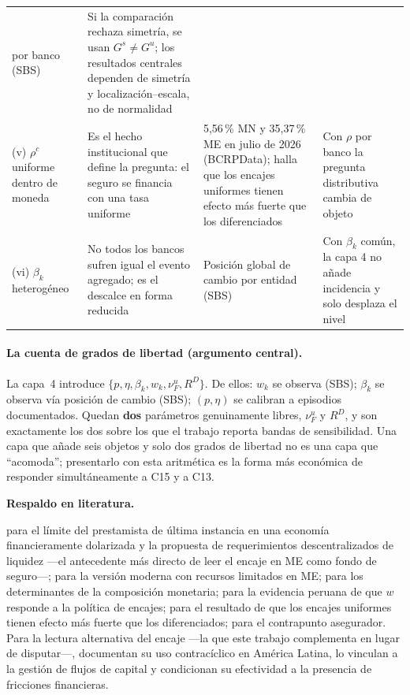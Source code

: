 \documentclass[11pt]{article}
\newcommand{\lit}{\par\noindent\textbf{Respaldo en literatura.}\par}
\theoremstyle{definition}
\begin{document}
\begin{longtable}{@{}p{3.5cm}p{4.4cm}p{3.0cm}p{3.6cm}@{}}
por banco (SBS) &
Si la comparaci\'on rechaza simetr\'ia, se usan $G^s\neq G^u$; los resultados
centrales dependen de simetr\'ia y localizaci\'on--escala, no de normalidad \\
(v) $\rho^c$ uniforme dentro de moneda &
Es el hecho institucional que define la pregunta: el seguro se financia con una
tasa uniforme &
5{,}56\,\% MN y 35{,}37\,\% ME en julio de 2026 (BCRPData);
\citet{cantu2024} halla que los encajes uniformes tienen efecto m\'as fuerte que
los diferenciados &
Con $\rho$ por banco la pregunta distributiva cambia de objeto \\
(vi) $\beta_k$ heterog\'eneo &
No todos los bancos sufren igual el evento agregado; es el descalce en forma
reducida &
Posici\'on global de cambio por entidad (SBS) &
Con $\beta_k$ com\'un, la capa 4 no a\~nade incidencia y solo desplaza el nivel \\
\bottomrule
\end{longtable}

\paragraph{La cuenta de grados de libertad (argumento central).} La capa~4
introduce $\{p,\eta,\beta_k,w_k,\nu^u_F,R^D\}$. De ellos: $w_k$ se observa (SBS);
$\beta_k$ se observa v\'ia posici\'on de cambio (SBS); $(p,\eta)$ se calibran a
episodios documentados. Quedan \textbf{dos} par\'ametros genuinamente libres,
$\nu^u_F$ y $R^D$, y son exactamente los dos sobre los que el trabajo reporta
bandas de sensibilidad. Una capa que a\~nade seis objetos y solo dos grados de
libertad no es una capa que ``acomoda''; presentarlo con esta aritm\'etica es la
forma m\'as econ\'omica de responder simult\'aneamente a C15 y a C13.

\lit
\citet{levyyeyati2008} para el l\'imite del prestamista de \'ultima instancia en una
econom\'ia financieramente dolarizada y la propuesta de requerimientos
descentralizados de liquidez ---el antecedente m\'as directo de leer el encaje en
ME como fondo de seguro---; \citet{bocolalorenzoni2020} para la versi\'on moderna
con recursos limitados en ME; \citet{izelevyyeyati2005} para los determinantes de
la composici\'on monetaria; \citet{castillo2016} para la evidencia peruana de que
$w$ responde a la pol\'itica de encajes; \citet{cantu2024} para el resultado de que
los encajes uniformes tienen efecto m\'as fuerte que los diferenciados;
\citet{dalgic2024} para el contrapunto asegurador. Para la lectura alternativa del
encaje ---la que este trabajo complementa en lugar de disputar---,
\citet{montoromoreno2011} documentan su uso contrac\'iclico en Am\'erica Latina,
\citet{brei2018} lo vinculan a la gesti\'on de flujos de capital y
\citet{glockertowbin2012} condicionan su efectividad a la presencia de fricciones
financieras.
\end{document}
